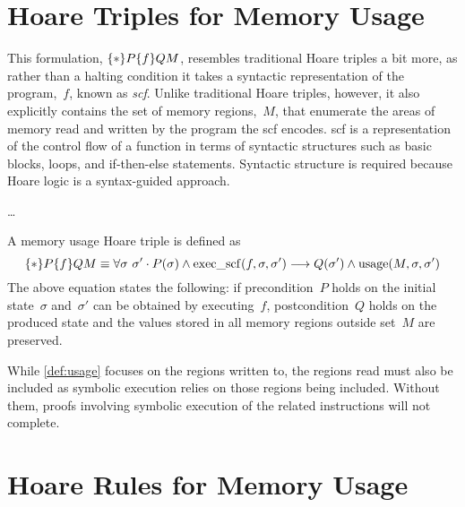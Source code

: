 \section{Hoare Triples for Memory Usage}\label{se:hoare2}
This formulation, $\{*\}P\{f\}{Q}{M}$,
resembles traditional Hoare triples a bit more,
as rather than a halting condition
it takes a syntactic representation of the program,~$f$, known as \emph{\ac{scf}}.
Unlike traditional Hoare triples, however,
it also explicitly contains the set of memory regions,~$M$,
that enumerate the areas of memory read and written by the program
the \ac{scf} encodes.
\Ac{scf} is a representation of the control flow of a function
in terms of syntactic structures such as basic blocks,
loops, and if-then-else statements.
Syntactic structure is required because Hoare logic is a syntax-guided approach.

\todo\dots

\begin{definition}\label{def:usage}
  A memory usage Hoare triple is defined as
  \begin{equation*}
    \{*\}P\{f\}{Q}{M}\equiv
    \forall\sigma~\sigma'\cdot P(\sigma)\wedge\operatorname{exec\_scf}(f,\sigma,\sigma')\longrightarrow
    Q(\sigma')\wedge\operatorname{usage}(M,\sigma,\sigma')
  \end{equation*}
  The above equation states the following:
  if precondition~$P$ holds on the initial state~$\sigma$
  and~$\sigma'$ can be obtained by executing~$f$,
  postcondition~$Q$ holds on the produced state
  and the values stored in all memory regions outside set~$M$ are preserved.
\end{definition}
While \cref{def:usage} focuses on the regions written to,
the regions read must also be included as symbolic execution
relies on those regions being included.
Without them, proofs involving symbolic execution
of the related instructions will not complete.


\section{Hoare Rules for Memory Usage}\label{se:hoare_rules}
